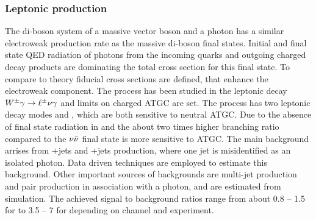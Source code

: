 \subsubsection{Leptonic \Vg production}
\label{sss-Vgammaprod}



The di-boson system of a massive vector boson and a photon has a similar 
electroweak production rate as the massive di-boson final states. Initial
and final state QED radiation of photons from the incoming quarks and
outgoing charged decay products are dominating the total cross section 
for this final state. To compare to theory fiducial cross sections are defined,
that enhance the electroweak component. The \Wg process has been studied in the
leptonic decay $W^{\pm}\gamma \rightarrow \ell^\pm \nu \gamma $ and limits on charged ATGC are set. The \Zg process
has two leptonic decay modes \Zgllg\; and \Zgvvg, which are both sensitive
to neutral ATGC. Due to the absence of final state radiation in \Ztovv\;
and the about two times higher branching ratio compared to \Ztoll\;
the $\nu\bar{\nu}$ final state is more sensitive to ATGC.
The main background arrises from \W+jets and \Z+jets production, where one 
jet is misidentified as an isolated photon. Data driven techniques are employed
to estimate this background. Other important sources of backgrounds are multi-jet production
and \ttbar\; pair production in association with a photon, and are estimated from simulation.
The achieved signal to background ratios range from about 0.8 -- 1.5 for \Wglvg\; to 3.5 -- 7 for \Ztoll\;
depending on channel and experiment. 

